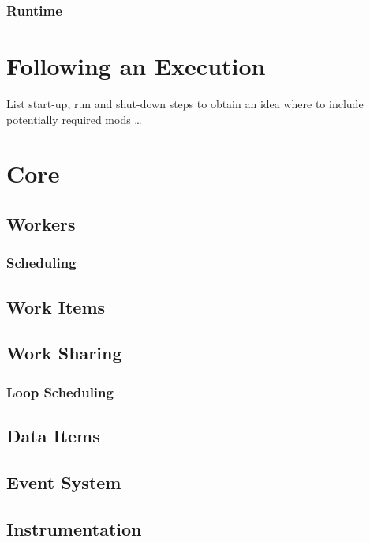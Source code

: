 \subsubsection{Runtime}


\section{Following an Execution}
List start-up, run and shut-down steps to obtain an idea where to include
potentially required mods \ldots

\section{Core}
\subsection{Workers}
\subsubsection{Scheduling}
\subsection{Work Items}
\subsection{Work Sharing}
\subsubsection{Loop Scheduling}
\subsection{Data Items}
\subsection{Event System}

\subsection{Instrumentation}
\label{sec:runtime.instrumentation}

